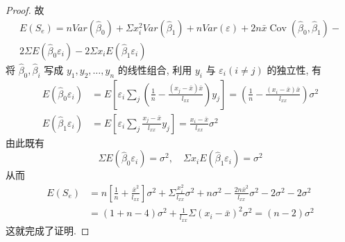 \begin{proof}
    故
    \begin{equation*}
    \begin{array}{c}
    {E\left(S_{e}\right)=n Var\left(\hat{\beta}_{0}\right)+\Sigma x_{i}^{2} Var\left(\hat{\beta}_{1}\right)+n Var(\varepsilon)+2 n \bar{x} \operatorname{Cov}\left(\hat{\beta}_{0}, \hat{\beta}_{1}\right)-} \\ 
    {2 \Sigma E(\hat{\beta}_{0} \varepsilon_{i})-2 \Sigma x_{i} E(\hat{\beta}_{1} \varepsilon_{i})}\end{array}
    \end{equation*}
    将 $\hat{\beta}_0, \hat{\beta}_i$ 写成 $y_1, y_2, \ldots, y_n$ 的线性组合, 利用 $y_i$ 与 $\varepsilon_i(i \neq j)$ 的独立性, 有
    \begin{equation*}
    \begin{split}
        E(\hat{\beta}_{0} \varepsilon_{i})& =E\left[\varepsilon_{i} \sum_{j}\left(\frac{1}{n}-\frac{\left(x_{j}-\bar{x}\right) \bar{x}}{l_{x x}}\right) y_{j}\right]=\left(\frac{1}{n}-\frac{\left(x_{i}-\bar{x}\right) \bar{x}}{l_{x x}}\right) \sigma^{2}\\
        E(\hat{\beta}_{1} \varepsilon_{i}) &=E\left[\varepsilon_{i} \sum_{j} \frac{x_{j}-\bar{x}}{l_{x x}} y_{j}\right]=\frac{x_{i}-\bar{x}}{l_{x x}} \sigma^{2}
    \end{split}
    \end{equation*}
    由此既有
    \begin{equation*}
    \Sigma E\left(\hat{\beta}_{0} \varepsilon_{i}\right)=\sigma^{2}, \quad \Sigma x_{i} E\left(\hat{\beta}_{1} \varepsilon_{i}\right)=\sigma^{2}
    \end{equation*}
    从而
    \begin{equation*}
    \begin{aligned} E\left(S_{e}\right) &=n\left[\frac{1}{n}+\frac{\bar{x}^{2}}{l_{x x}}\right] \sigma^{2}+\Sigma \frac{x_{i}^{2}}{l_{x x}}\sigma^{2} + n \sigma^{2}-\frac{2 n \bar{x}^{2}}{l_{x x}} \sigma^{2}-2 \sigma^{2}-2 \sigma^{2} \\ &=(1+n-4) \sigma^{2}+\frac{1}{l_{x x}} \Sigma\left(x_{i}-\bar{x}\right)^{2} \sigma^{2}=(n-2) \sigma^{2} \end{aligned}
    \end{equation*}
    这就完成了证明.
\end{proof}

